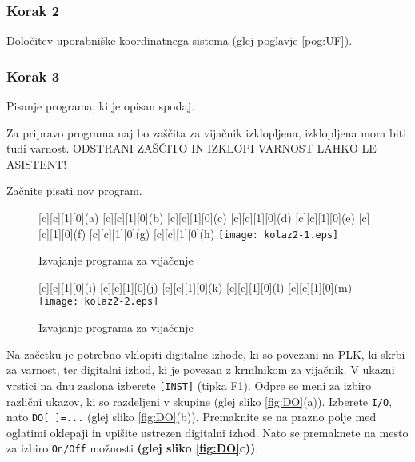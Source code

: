 \subsubsection{Korak 2} Določitev uporabniške koordinatnega sistema (glej poglavje \ref{pog:UF}).
\subsubsection{Korak 3} Pisanje programa, ki je opisan spodaj. 

\vspace{0.35cm}
\begin{mdframed}[backgroundcolor=red!20, shadow=true,roundcorner=8pt]
	
Za pripravo programa naj bo zaščita za vijačnik izklopljena, izklopljena mora biti tudi varnost. \newline ODSTRANI ZAŠČITO IN IZKLOPI VARNOST LAHKO LE ASISTENT!
	
\end{mdframed}

Začnite pisati nov program.

\begin{figure}[!hbt]
	\centering
	[c][1][0]{(a)}
	[c][1][0]{(b)}		
	[c][1][0]{(c)}
	[c][1][0]{(d)}
	[c][1][0]{(e)}	
	[c][1][0]{(f)}			
	[c][1][0]{(g)}
	[c][1][0]{(h)}
	\texttt{[image: kolaz2-1.eps]}
	\caption{Izvajanje programa za vijačenje}
	\label{fig:kolaz2-1}
\end{figure}

\begin{figure}[!hbt]
	\centering
	[c][1][0]{(i)}
	[c][1][0]{(j)}		
	[c][1][0]{(k)}
	[c][1][0]{(l)}
	[c][1][0]{(m)}	
	\texttt{[image: kolaz2-2.eps]}
	\caption{Izvajanje programa za vijačenje}
	\label{fig:kolaz2-2}
\end{figure}

Na začetku je potrebno vklopiti digitalne izhode, ki so povezani na PLK, ki skrbi za varnost, ter digitalni izhod, ki je povezan z krmlnikom za vijačnik. V ukazni vrstici na dnu zaslona izberete \verb|[INST]| (tipka F1). Odpre se meni za izbiro različni ukazov, ki so razdeljeni v skupine (glej sliko \ref{fig:DO}(a)). Izberete \verb|I/O|, nato \verb|DO[ ]=...| (glej sliko \ref{fig:DO}(b)). Premaknite se na prazno polje med oglatimi oklepaji in vpišite ustrezen digitalni izhod. Nato se premaknete na mesto za izbiro \verb*|On/Off| možnosti \textbf{(glej sliko \ref{fig:DO}c))}. 

